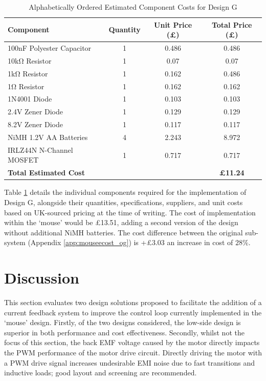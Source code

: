 \begin{table}[H]
\centering
\caption{Alphabetically Ordered Estimated Component Costs for Design G}
\begin{tabular}{|l|c|c|c|}
\hline
\textbf{Component}                & \textbf{Quantity} & \textbf{Unit Price (£)} & \textbf{Total Price (£)}\\ \hline
100nF Polyester Capacitor\cite{rs_100nfcap_poly} & 1 & 0.486 & 0.486\\ \hline
10kΩ Resistor \cite{rs_10kresistor} & 1 & 0.07 & 0.07\\ \hline
1kΩ Resistor \cite{rs_1kresistor} & 1 & 0.162 & 0.486\\ \hline
1Ω Resistor \cite{rs_res1}& 1 & 0.162 & 0.162\\ \hline
1N4001 Diode \cite{rs_1n4001} & 1 & 0.103 & 0.103\\ \hline
2.4V Zener Diode \cite{rs_24vzdiode} & 1 & 0.129 & 0.129\\ \hline
8.2V Zener Diode \cite{rs_82vzdiode} & 1 & 0.117 & 0.117\\ \hline
NiMH 1.2V AA Batteries \cite{rs_nimh} & 4 & 2.243 & 8.972\\ \hline
IRLZ44N N-Channel MOSFET \cite{rs_irlz44n} & 1 & 0.717 & 0.717\\ \hline\hline
\textbf{Total Estimated Cost} &&&\textbf{£11.24}\\ \hline
\end{tabular}
\label{tab:cost_designg}
\end{table}

Table \ref{tab:cost_designg} details the individual components required for the implementation of Design G, alongside their quantities, specifications, suppliers, and unit costs based on UK-sourced pricing at the time of writing. The cost of implementation within the `mouse' would be £13.51, adding a second version of the design without additional NiMH batteries. The cost difference between the original sub-system (Appendix \ref{app:mouseecost_og}) is +£3.03 an increase in cost of \(28\%\).

\section{Discussion}
This section evaluates two design solutions proposed to facilitate the addition of a current feedback system to improve the control loop currently implemented in the `mouse' design. Firstly, of the two designs considered, the low-side design is superior in both performance and cost effectiveness. Secondly, whilst not the focus of this section, the back EMF voltage caused by the motor directly impacts the PWM performance of the motor drive circuit. Directly driving the motor with a PWM drive signal increases undesirable EMI noise due to fast transitions and inductive loads; good layout and screening are recommended. 

